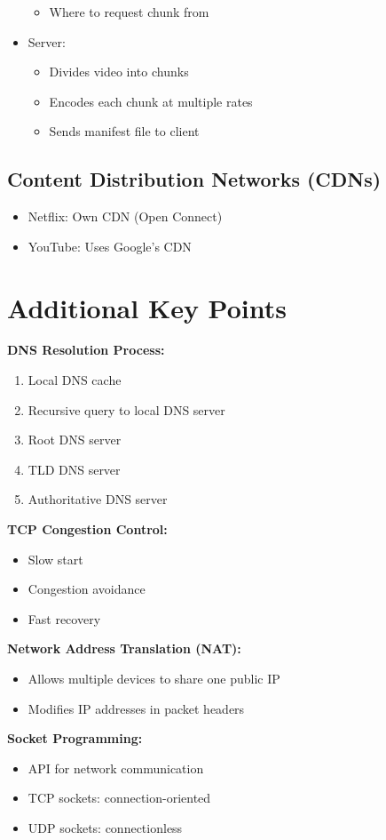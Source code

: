 \documentclass[9pt]{extarticle}
\begin{document}
\begin{multicols*}{3}
\begin{itemize}
\begin{itemize}
\item Where to request chunk from
\end{itemize}
\item Server:
\begin{itemize}
\item Divides video into chunks
\item Encodes each chunk at multiple rates
\item Sends manifest file to client
\end{itemize}
\end{itemize}
{\color{subsectioncolor}\subsection*{Content Distribution Networks (CDNs)}}
\begin{itemize}
\item Netflix: Own CDN (Open Connect)
\item YouTube: Uses Google's CDN
\end{itemize}
{\color{sectioncolor}\section*{\centering Additional Key Points}}
\textbf{DNS Resolution Process:}
\begin{enumerate}
\item Local DNS cache
\item Recursive query to local DNS server
\item Root DNS server
\item TLD DNS server
\item Authoritative DNS server
\end{enumerate}
\textbf{TCP Congestion Control:}
\begin{itemize}
\item Slow start
\item Congestion avoidance
\item Fast recovery
\end{itemize}
\textbf{Network Address Translation (NAT):}
\begin{itemize}
\item Allows multiple devices to share one public IP
\item Modifies IP addresses in packet headers
\end{itemize}
\textbf{Socket Programming:}
\begin{itemize}
\item API for network communication
\item TCP sockets: connection-oriented
\item UDP sockets: connectionless
\end{itemize}
\end{multicols*}
\end{document}
